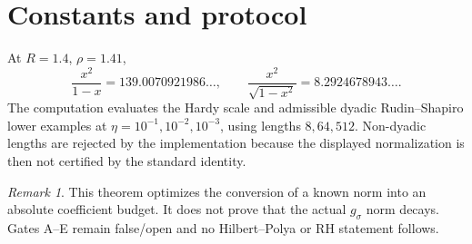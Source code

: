\documentclass[11pt]{article}
\theoremstyle{remark}\newtheorem{remark}[theorem]{Remark}
\begin{document}
\section{Constants and protocol}
At $R=1.4$, $\rho=1.41$,
\[
 \frac{x^2}{1-x}=139.0070921986\ldots,\qquad
 \frac{x^2}{\sqrt{1-x^2}}=8.2924678943\ldots.
\]
The computation evaluates the Hardy scale and admissible dyadic
Rudin--Shapiro lower examples at $\eta=10^{-1},10^{-2},10^{-3}$, using
lengths $8,64,512$.  Non-dyadic lengths are rejected by the implementation
because the displayed normalization is then not certified by the standard
identity.

\begin{remark}
This theorem optimizes the conversion of a known norm into an absolute
coefficient budget.  It does not prove that the actual $g_\sigma$ norm
decays.  Gates A--E remain false/open and no Hilbert--Polya or RH statement
follows.
\end{remark}
\end{document}
